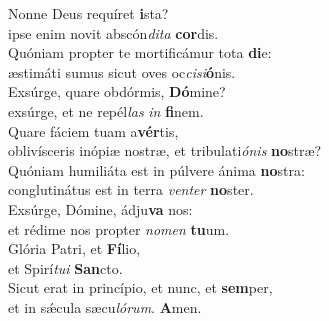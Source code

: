 \evenverse Nonne Deus requíret \textbf{i}sta?~\*\\
\evenverse ipse enim novit abscón\textit{di}\textit{ta} \textbf{cor}dis.\\
\oddverse Quóniam propter te mortificámur tota \textbf{di}e:~\*\\
\oddverse æstimáti sumus sicut oves oc\textit{ci}\textit{si}\textbf{ó}nis.\\
\evenverse Exsúrge, quare obdórmis, \textbf{Dó}mine?~\*\\
\evenverse exsúrge, et ne repél\textit{las} \textit{in} \textbf{fi}nem.\\
\oddverse Quare fáciem tuam a\textbf{vér}tis,~\*\\
\oddverse oblivísceris inópiæ nostræ, et tribulati\textit{ó}\textit{nis} \textbf{no}stræ?\\
\evenverse Quóniam humiliáta est in púlvere ánima \textbf{no}stra:~\*\\
\evenverse conglutinátus est in terra \textit{ven}\textit{ter} \textbf{no}ster.\\
\oddverse Exsúrge, Dómine, ádju\textbf{va} nos:~\*\\
\oddverse et rédime nos propter \textit{no}\textit{men} \textbf{tu}um.\\
\evenverse Glória Patri, et \textbf{Fí}lio,~\*\\
\evenverse et Spirí\textit{tu}\textit{i} \textbf{San}cto.\\
\oddverse Sicut erat in princípio, et nunc, et \textbf{sem}per,~\*\\
\oddverse et in sǽcula sæcu\textit{ló}\textit{rum}. \textbf{A}men.\\
